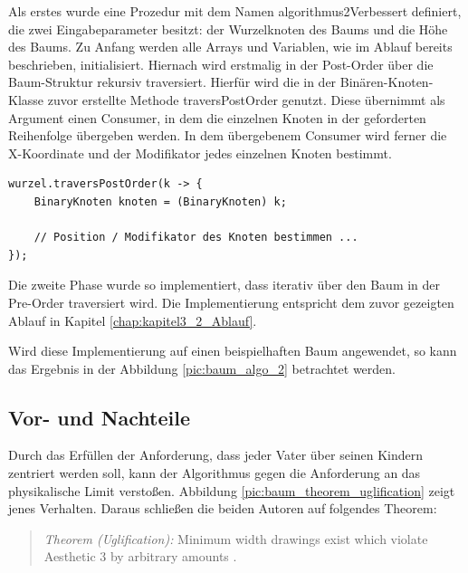 Als erstes wurde eine Prozedur mit dem Namen \glqq algorithmus2Verbessert\grqq{} 
definiert, die zwei Eingabeparameter besitzt: der Wurzelknoten des Baums 
und die Höhe des Baums. Zu Anfang werden alle Arrays und Variablen, wie im Ablauf 
bereits beschrieben, initialisiert. Hiernach wird erstmalig in der Post-Order über 
die Baum-Struktur rekursiv traversiert. Hierfür wird die in der Binären-Knoten-Klasse 
zuvor erstellte Methode \glqq traversPostOrder\grqq{} genutzt. Diese übernimmt als Argument einen Consumer, 
in dem die einzelnen Knoten in der geforderten Reihenfolge übergeben werden. In dem übergebenem Consumer 
wird ferner die X-Koordinate und der Modifikator jedes einzelnen Knoten bestimmt.

\begin{lstlisting}[caption=Vereinfachte Implementierung der Phase 1, label=code:algo2_phase1]
wurzel.traversPostOrder(k -> {
    BinaryKnoten knoten = (BinaryKnoten) k;

    // Position / Modifikator des Knoten bestimmen ...
});
\end{lstlisting}

Die zweite Phase wurde so implementiert, dass iterativ über den Baum in der Pre-Order traversiert 
wird. Die Implementierung entspricht dem zuvor gezeigten Ablauf in Kapitel \ref{chap:kapitel3_2_Ablauf}. 

Wird diese Implementierung auf einen beispielhaften Baum angewendet, so kann das Ergebnis
in der Abbildung \ref{pic:baum_algo_2} betrachtet werden.

\subsection{Vor- und Nachteile}
Durch das Erfüllen der Anforderung, dass jeder Vater über seinen Kindern zentriert werden soll, kann der Algorithmus gegen
die Anforderung an das physikalische Limit verstoßen. 
Abbildung \ref{pic:baum_theorem_uglification} zeigt jenes Verhalten. Daraus schließen die beiden Autoren auf folgendes Theorem:

\begin{quotation}
	\textit{Theorem (Uglification):} Minimum width drawings exist which violate Aesthetic 3 by arbitrary amounts \cite[S. 519]{q1}.
\end{quotation}


